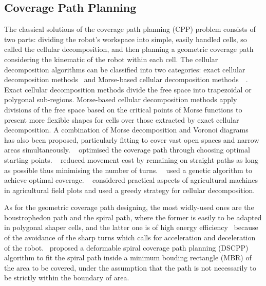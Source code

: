 \documentclass[Afour,sageh,times]{sagej}
\begin{document}
\subsection{Coverage Path Planning}
The classical solutions of the coverage path planning (CPP) problem consists of two parts: dividing the robot's workspace into simple, easily handled cells, so called the cellular decomposition, and then planning a geometric coverage path considering the kinematic of the robot within each cell. 
The cellular decomposition algorithms can be classified into two categories: exact cellular decomposition methods~\cite{lumelsky1990dynamic} and Morse-based cellular decomposition methods~\cite{choset2000exact}~\cite{Acar2002Morse}. 
Exact cellular decomposition methods divide the free space into trapezoidal or polygonal sub-regions. 
Morse-based cellular decomposition methods apply divisions of the free space based on the critical points of Morse functions to present more flexible shapes for cells over those extracted by exact cellular decomposition. A combination of Morse decomposition and Voronoi diagrams~\cite{Choset2000Sensor-based} has also been proposed, particularly fitting to cover vast open spaces and narrow areas simultaneously.
~\cite{Atkar2003Towards} optimised the coverage path through choosing optimal starting points.
~\cite{Huang2001Optimal} reduced movement cost by remaining on straight paths as long as possible thus minimising the number of turns.
~\cite{Jimenez2007Optimal} used a genetic algorithm to achieve optimal coverage.
~\cite{Oksanen2009Coverage} considered practical aspects of agricultural machines in agricultural field plots and used a greedy strategy for cellular decomposition.

As for the geometric coverage path designing, the most widly-used ones are the boustrophedon path and the spiral path, where the former is easily to be adapted in polygonal shaper cells, and the latter one is of high energy efficiency~\cite{Mei2004Energy} because of the avoidance of the sharp turns which calls for acceleration and deceleration of the robot.~\cite{Hassan2018A} proposed a deformable spiral coverage path planning (DSCPP) algorithm to fit the spiral path inside a minimum bouding rectangle (MBR) of the area to be covered, under the assumption that the path is not necessarily to be strictly within the boundary of area. 
\end{document}
